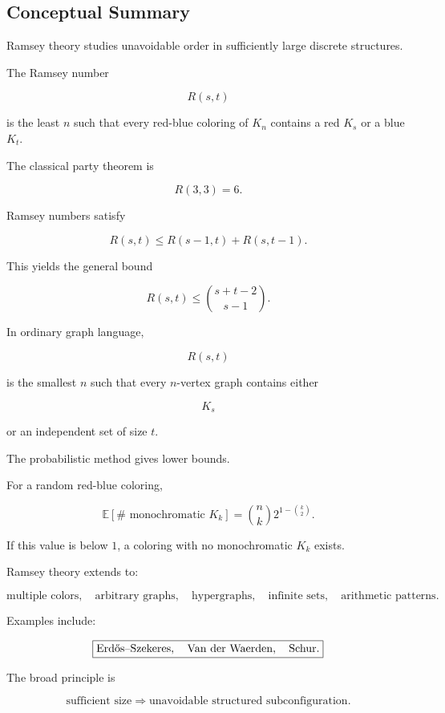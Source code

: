 \subsection{Conceptual Summary}
\label{subsec:ramsey-theory-summary}

Ramsey theory studies unavoidable order in sufficiently large discrete
structures.

The Ramsey number

\[
\boxed{
R(s,t)
}
\]

is the least \(n\) such that every red-blue coloring of \(K_n\) contains
a red \(K_s\) or a blue \(K_t\).

The classical party theorem is

\[
\boxed{
R(3,3)=6.
}
\]

Ramsey numbers satisfy

\[
\boxed{
R(s,t)
\leq
R(s-1,t)+R(s,t-1).
}
\]

This yields the general bound

\[
\boxed{
R(s,t)
\leq
\binom{s+t-2}{s-1}.
}
\]

In ordinary graph language,

\[
R(s,t)
\]

is the smallest \(n\) such that every \(n\)-vertex graph contains either

\[
K_s
\]

or an independent set of size \(t\).

The probabilistic method gives lower bounds.

For a random red-blue coloring,

\[
\boxed{
\mathbb{E}[\#\text{ monochromatic }K_k]
=
\binom nk
2^{1-\binom{k}{2}}.
}
\]

If this value is below \(1\), a coloring with no monochromatic \(K_k\)
exists.

Ramsey theory extends to:

\[
\boxed{
\text{multiple colors},
\quad
\text{arbitrary graphs},
\quad
\text{hypergraphs},
\quad
\text{infinite sets},
\quad
\text{arithmetic patterns}.
}
\]

Examples include:

\[
\boxed{
\text{Erd\H{o}s--Szekeres},
\quad
\text{Van der Waerden},
\quad
\text{Schur}.
}
\]

The broad principle is

\[
\boxed{
\text{sufficient size}
\Longrightarrow
\text{unavoidable structured subconfiguration}.
}
\]

